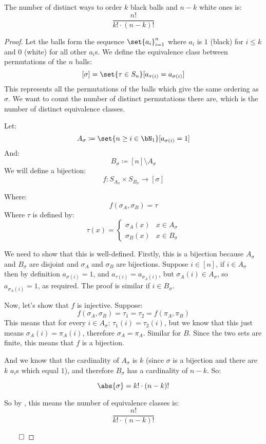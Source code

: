 \begin{thrm*}[twoObjOrderingsTheorem]

	The number of distinct ways to order $k$ black balls and $n-k$ white ones is:
	\[ \frac{n!}{k!\cdot(n-k)!} \]

\end{thrm*}

\begin{proof}

	Let the balls form the sequence $\set{a_i}_{i=1}^n$ where $a_i$ is $1$ (black) for $i\leq k$ and $0$ (white) for all other
	$a_i$s. We define the equivalence class between permutations of the $n$ balls:
	\[ [\sigma] = \set{\tau\in S_n}[a_{\tau(i)} = a_{\sigma(i)}] \]
	This represents all the permutations of the balls which give the same ordering as $\sigma$. We want to count the number
	of distinct permutations there are, which is the number of distinct equivalence classes.

	Let:
	\[ A_\sigma\coloneqq\set{n\geq i\in\bN_1}[a_{\sigma(i)}=1] \]
	And:
	\[ B_\sigma\coloneqq[n]\setminus A_\sigma \]
	We will define a bijection:
	\[ f\colon S_{A_\sigma}\times S_{B_\sigma}\longrightarrow[\sigma] \]

	Where:
	\[ f(\sigma_A, \sigma_B) = \tau \]
	Where $\tau$ is defined by:
	\[ \tau(x) = \begin{cases} \sigma_A(x) & x\in A_\sigma \\ \sigma_B(x) & x\in B_\sigma \end{cases} \]

	We need to show that this is well-defined. Firstly, this is a bijection because $A_\sigma$ and $B_\sigma$ are disjoint and
	$\sigma_A$ and $\sigma_B$ are bijections.
	Suppose $i\in[n]$, if $i\in A_\sigma$ then by definition $a_{\sigma(i)}=1$, and $a_{\tau(i)} = a_{\sigma_A(i)}$,
	but $\sigma_A(i)\in A_\sigma$, so $a_{\sigma_A(i)}=1$, as required.
	The proof is similar if $i\in B_\sigma$.

	Now, let's show that $f$ is injective. Suppose:
	\[ f(\sigma_A, \sigma_B) = \tau_1 = \tau_2 = f(\pi_A, \pi_B) \]
	This means that for every $i\in A_\sigma$: $\tau_1(i)=\tau_2(i)$, but we know that this just means $\sigma_A(i)=\pi_A(i)$,
	therefore $\sigma_A=\pi_A$. Similar for $B$. Since the two sets are finite, this means that $f$ is a bijection.
	
	And we know that the cardinality of $A_\sigma$ is $k$ (since $\sigma$ is a bijection and there are $k$ $a_i$s which equal
	$1$), and therefore $B_\sigma$ has a cardinality of $n-k$. So:

	\[ \abs{\sigma} = k!\cdot(n-k)! \]
	
	So by , this means the number of equivalence classes is:
	\[ \frac{n!}{k!\cdot(n-k)!} \]

	\hfill$\qed$

\end{proof}

